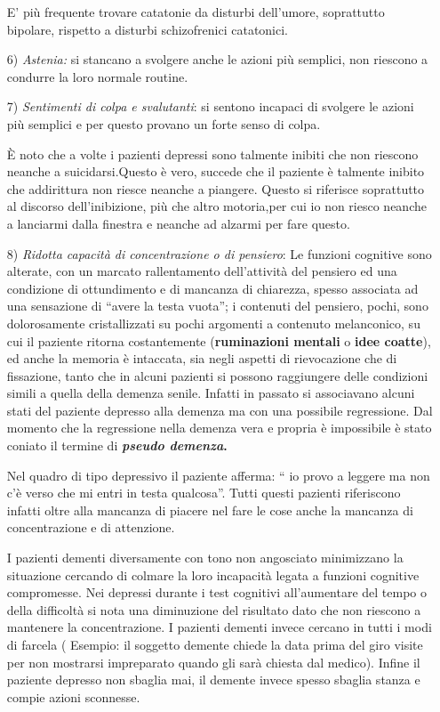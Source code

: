 \begin{itemize}
E' più frequente trovare catatonie da disturbi dell'umore, soprattutto
bipolare, rispetto a disturbi schizofrenici catatonici.

\item[6)]
\emph{Astenia:} si stancano a svolgere anche le azioni più semplici,
non riescono a condurre la loro normale routine.

\item[7)]
\emph{Sentimenti di colpa e svalutanti}: si sentono incapaci di
svolgere le azioni più semplici e per questo provano un forte senso di
colpa.

È noto che a volte i pazienti depressi sono talmente inibiti che non
riescono neanche a suicidarsi.Questo è vero, succede che il paziente è
talmente inibito che addirittura non riesce neanche a piangere. Questo
si riferisce soprattutto al discorso dell'inibizione, più che altro
motoria,per cui io non riesco neanche a lanciarmi dalla finestra e
neanche ad alzarmi per fare questo.

\item[8)]
\emph{Ridotta capacità di concentrazione o di pensiero}: Le funzioni
cognitive sono alterate, con un marcato rallentamento dell'attività del
pensiero ed una condizione di ottundimento e di mancanza di chiarezza,
spesso associata ad una sensazione di ``avere la testa vuota''; i
contenuti del pensiero, pochi, sono dolorosamente cristallizzati su
pochi argomenti a contenuto melanconico, su cui il paziente ritorna
costantemente (\textbf{ruminazioni mentali} o \textbf{idee coatte}), ed
anche la memoria è intaccata, sia negli aspetti di rievocazione che di
fissazione, tanto che in alcuni pazienti si possono raggiungere delle
condizioni simili a quella della demenza senile. Infatti in passato si
associavano alcuni stati del paziente depresso alla demenza ma con una
possibile regressione. Dal momento che la regressione nella demenza vera
e propria è impossibile è stato coniato il termine di
\textbf{\emph{pseudo demenza}.}

Nel quadro di tipo depressivo il paziente afferma: `` io provo a leggere
ma non c'è verso che mi entri in testa qualcosa''. Tutti questi pazienti
riferiscono infatti oltre alla mancanza di piacere nel fare le cose
anche la mancanza di concentrazione e di attenzione.

I pazienti dementi diversamente con tono non angosciato minimizzano la
situazione cercando di colmare la loro incapacità legata a funzioni
cognitive compromesse. Nei depressi durante i test cognitivi
all'aumentare del tempo o della difficoltà si nota una diminuzione del
risultato dato che non riescono a mantenere la concentrazione. I
pazienti dementi invece cercano in tutti i modi di farcela ( Esempio: il
soggetto demente chiede la data prima del giro visite per non mostrarsi
impreparato quando gli sarà chiesta dal medico). Infine il paziente
depresso non sbaglia mai, il demente invece spesso sbaglia stanza e
compie azioni sconnesse.


\end{itemize}
